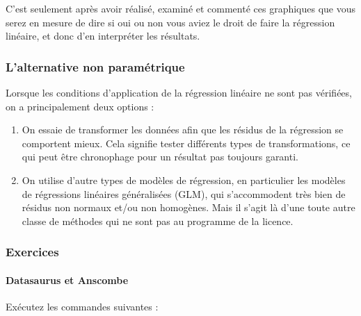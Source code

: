 \documentclass[
  a4paper,
]{article}
\providecommand{\tightlist}{%
  \setlength{\itemsep}{0pt}\setlength{\parskip}{0pt}}
\begin{document}
C'est seulement après avoir réalisé, examiné et commenté ces graphiques que vous serez en mesure de dire si oui ou non vous aviez le droit de faire la régression linéaire, et donc d'en interpréter les résultats.

\hypertarget{lalternative-non-paramuxe9trique-5}{%
\subsubsection{L'alternative non paramétrique}\label{lalternative-non-paramuxe9trique-5}}

Lorsque les conditions d'application de la régression linéaire ne sont pas vérifiées, on a principalement deux options :

\begin{enumerate}
\def\labelenumi{\arabic{enumi}.}
\tightlist
\item
  On essaie de transformer les données afin que les résidus de la régression se comportent mieux. Cela signifie tester différents types de transformations, ce qui peut être chronophage pour un résultat pas toujours garanti.
\item
  On utilise d'autre types de modèles de régression, en particulier les modèles de régressions linéaires généralisées (GLM), qui s'accommodent très bien de résidus non normaux et/ou non homogènes. Mais il s'agit là d'une toute autre classe de méthodes qui ne sont pas au programme de la licence.
\end{enumerate}

\hypertarget{exercices-1}{%
\subsubsection{Exercices}\label{exercices-1}}

\hypertarget{datasaurus-et-anscombe}{%
\paragraph{Datasaurus et Anscombe}\label{datasaurus-et-anscombe}}

Exécutez les commandes suivantes :
\end{document}
